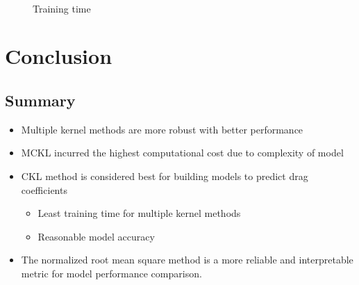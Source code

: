 \documentclass[11pt, letterpaper]{article}
\begin{document}
\begin{figure}[!h]
	\begin{center}
		\vspace{-10pt}
		\mbox{  
			 }
		\caption{Training time}
		\label{fig:training_time}
	\end{center}
\end{figure}

\section{Conclusion}
\subsection{Summary}
    \begin{itemize}
    \item Multiple kernel methods are more robust with better performance
    \item MCKL incurred the highest computational cost due to complexity of model
        \item CKL method is considered best for building models to predict drag coefficients
        \begin{itemize}
            \item Least training time for multiple kernel methods
            \item Reasonable model accuracy
        \end{itemize}
    \item The normalized root mean square method is a more reliable and interpretable metric for model performance comparison.
    \end{itemize}
    
\end{document}
